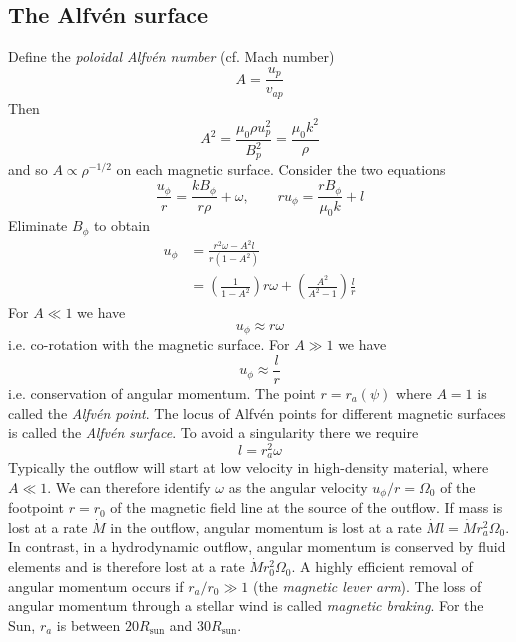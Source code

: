 \documentclass{jknotes}
\begin{document}
\subsection{The Alfv\'{e}n surface}
Define the \emph{poloidal Alfv\'{e}n number} (cf. Mach number)
\begin{equation}
	A = \frac{u_p}{v_{ap}}
\end{equation}
Then
\begin{equation}
	A^2 = \frac{\mu_0 \rho u_p^2}{B_p^2} = \frac{\mu_0 k^2}{\rho}
\end{equation}
and so $A \propto \rho^{-1/2}$ on each magnetic surface. Consider the two
equations
\begin{equation}
	\frac{u_\phi}{r} = \frac{k B_\phi}{r\rho} + \omega, \hspace{2em} ru_\phi =
	\frac{r B_\phi}{\mu_0 k} + l
\end{equation}
Eliminate $B_\phi$ to obtain
\begin{align}
	u_\phi &= \frac{r^2 \omega - A^2 l}{r(1-A^2)} \\
		   &= \left(\frac{1}{1-A^2}\right)r\omega + \left(\frac{A^2}{A^2
		   -1}\right) \frac{l}{r}
\end{align}
For $A \ll 1$ we have
\begin{equation}
	u_\phi \approx r \omega
\end{equation}
i.e. co-rotation with the magnetic surface. For $A \gg 1$ we have
\begin{equation}
	u_\phi \approx \frac{l}{r}
\end{equation}
i.e. conservation of angular momentum.
The point $r = r_a(\psi)$ where $A=1$ is called the \emph{Alfv\'{e}n point}.
The locus of Alfv\'{e}n points for different magnetic surfaces is called the
\emph{Alfv\'{e}n surface}. To avoid a singularity there we require 
\begin{equation}
	l = r_a^2 \omega
\end{equation}
Typically the outflow will start at low velocity in high-density material,
where $A \ll 1$. We can therefore identify $\omega$ as the angular velocity
$u_\phi/r = \Omega_0$ of the footpoint $r=r_0$ of the magnetic field line at
the source of the outflow. If mass is lost at a rate $\dot{M}$ in the outflow,
angular momentum is lost at a rate $\dot{M} l = \dot{M} r_a^2 \Omega_0$. In
contrast, in a hydrodynamic outflow, angular momentum is conserved by fluid
elements and is therefore lost at a rate $\dot{M}r_0^2 \Omega_0$. A highly
efficient removal of angular momentum occurs if $r_a/r_0 \gg 1$ (the
\emph{magnetic lever arm}). The loss of angular momentum through a stellar
wind is called \emph{magnetic braking}.  For the Sun, $r_a$ is between $20
R_{\text{sun}}$ and $30 R_{\text{sun}}$.
\end{document}
